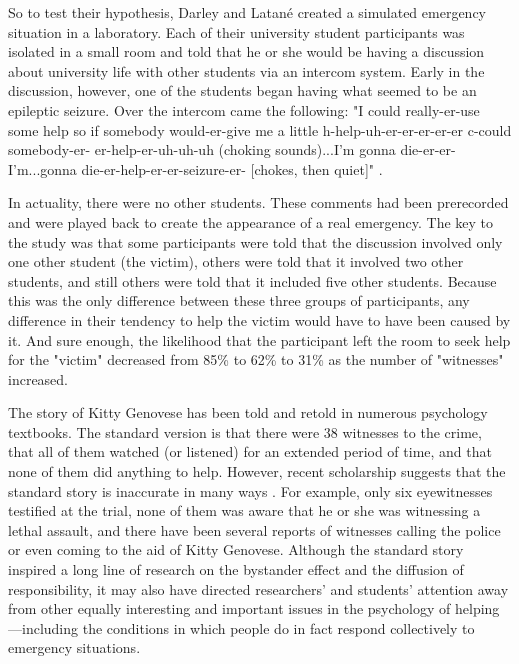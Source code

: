 So to test their hypothesis, Darley and Latan\'e created a simulated emergency situation in a laboratory. Each of their university student participants was isolated in a small room and told that he or she would be having a discussion about university life with other students via an intercom system. Early in the discussion, however, one of the students began having what seemed to be an epileptic seizure. Over the intercom came the following: "I could really-er-use some help so if somebody would-er-give me a little h-help-uh-er-er-er-er-er c-could somebody-er- er-help-er-uh-uh-uh (choking sounds)...I'm gonna die-er-er-I'm...gonna die-er-help-er-er-seizure-er- [chokes, then quiet]" \citep{darley_bystander_1968}.


In actuality, there were no other students. These comments had been prerecorded and were played back to create the appearance of a real emergency. The key to the study was that some participants were told that the discussion involved only one other student (the victim), others were told that it involved two other students, and still others were told that it included five other students. Because this was the only difference between these three groups of participants, any difference in their tendency to help the victim would have to have been caused by it. And sure enough, the likelihood that the participant left the room to seek help for the "victim" decreased from 85\% to 62\% to 31\% as the number of "witnesses" increased.


\color{fgcolor}\begin{kframe}




The story of Kitty Genovese has been told and retold in numerous psychology textbooks. The standard version is that there were 38 witnesses to the crime, that all of them watched (or listened) for an extended period of time, and that none of them did anything to help. However, recent scholarship suggests that the standard story is inaccurate in many ways \citep{manning_kitty_2007}. For example, only six eyewitnesses testified at the trial, none of them was aware that he or she was witnessing a lethal assault, and there have been several reports of witnesses calling the police or even coming to the aid of Kitty Genovese. Although the standard story inspired a long line of research on the bystander effect and the
 diffusion of responsibility, it may also have directed researchers' and students' attention away from other equally interesting and important issues in the psychology of helping---including the conditions in which people do in fact respond collectively to emergency situations.

\end{kframe}


